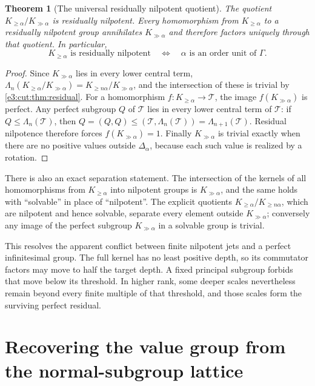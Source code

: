 \documentclass[11pt,letterpaper]{article}
\numberwithin{equation}{section}
\newtheorem{theorem}{Theorem}[section]
\theoremstyle{definition}
\theoremstyle{remark}
\newcommand{\comm}[2]{\left(#1,#2\right)}
\begin{document}
\begin{theorem}[The universal residually nilpotent quotient]\label{e3:cut:thm:universalrn}
The quotient $K_{\ge\alpha}/K_{\gg\alpha}$ is residually nilpotent. Every
homomorphism from $K_{\ge\alpha}$ to a residually nilpotent group annihilates
$K_{\gg\alpha}$ and therefore factors uniquely through that quotient. In
particular,
\begin{equation}\label{e3:cut:eq:orderunit}
 K_{\ge\alpha}\text{ is residually nilpotent}
 \quad\Longleftrightarrow\quad
 \alpha\text{ is an order unit of }\Gamma.
\end{equation}
\end{theorem}
\begin{proof}
Since $K_{\gg\alpha}$ lies in every lower central term,
$\Lambda_n(K_{\ge\alpha}/K_{\gg\alpha})=K_{\ge n\alpha}/K_{\gg\alpha}$, and
the intersection of these is trivial by \cref{e3:cut:thm:residual}. For a
homomorphism $f:K_{\ge\alpha}\to\mathcal T$, the image $f(K_{\gg\alpha})$ is
perfect. Any perfect subgroup $Q$ of $\mathcal T$ lies in every lower central
term of $\mathcal T$: if $Q\le\Lambda_n(\mathcal T)$, then
$Q=\comm QQ\le\comm{\mathcal T}{\Lambda_n(\mathcal T)}=\Lambda_{n+1}(\mathcal T)$.
Residual nilpotence therefore forces $f(K_{\gg\alpha})=1$. Finally
$K_{\gg\alpha}$ is trivial exactly when there are no positive values outside
$\Delta_\alpha$, because each such value is realized by a rotation.
\end{proof}

There is also an exact separation statement. The intersection of the kernels
of all homomorphisms from $K_{\ge\alpha}$ into nilpotent groups is
$K_{\gg\alpha}$, and the same holds with ``solvable'' in place of
``nilpotent''. The explicit quotients $K_{\ge\alpha}/K_{\ge n\alpha}$, which are
nilpotent and hence solvable, separate every element outside $K_{\gg\alpha}$;
conversely any image of the perfect subgroup $K_{\gg\alpha}$ in a solvable
group is trivial.

This resolves the apparent conflict between finite nilpotent jets and a perfect
infinitesimal group. The full kernel has no least positive depth, so its
commutator factors may move to half the target depth. A fixed principal
subgroup forbids that move below its threshold. In higher rank, some deeper
scales nevertheless remain beyond every finite multiple of that threshold, and
those scales form the surviving perfect residual.

\section{Recovering the value group from the normal-subgroup lattice}\label{e3:cut:sec:lattice}
\end{document}
